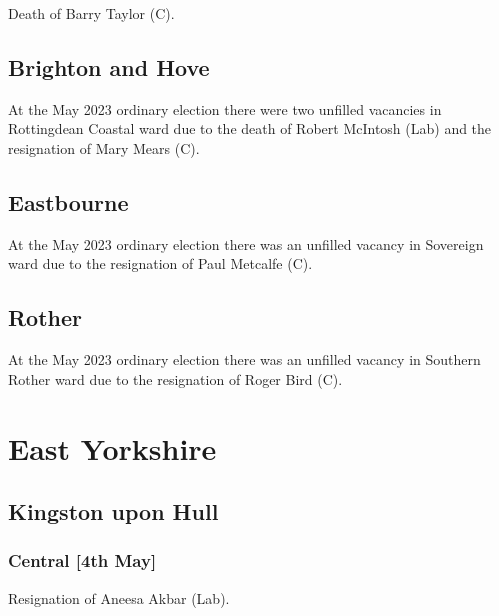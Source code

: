 \documentclass[a4paper,openany]{book}
\begin{document}
\begin{resultsiii}

Death of Barry Taylor (C).

\subsection*{Brighton and Hove}

At the May 2023 ordinary election there were two unfilled vacancies in Rottingdean Coastal ward due to the death of Robert McIntosh (Lab) and the resignation of Mary Mears (C).%

\subsection*{Eastbourne}

At the May 2023 ordinary election there was an unfilled vacancy in Sovereign ward due to the resignation of Paul Metcalfe (C).%

\subsection*{Rother}

At the May 2023 ordinary election there was an unfilled vacancy in Southern Rother ward due to the resignation of Roger Bird (C).%

\section{East Yorkshire}

\subsection*{Kingston upon Hull}

\subsubsection*{Central \hspace*{\fill}\nolinebreak[1]%
	\enspace\hspace*{\fill}
	[4th May]}


Resignation of Aneesa Akbar (Lab).


\end{resultsiii}
\end{document}
